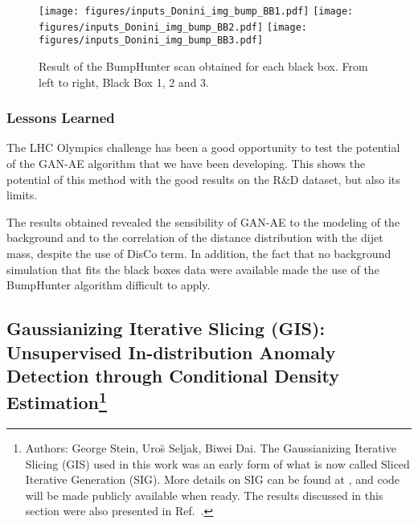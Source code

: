 \documentclass[a4paper,11pt]{article}
\begin{document}
\begin{figure}[h!]
\centering
\texttt{[image: figures/inputs\_Donini\_img\_bump\_BB1.pdf]}
\texttt{[image: figures/inputs\_Donini\_img\_bump\_BB2.pdf]}
\texttt{[image: figures/inputs\_Donini\_img\_bump\_BB3.pdf]}
\caption{Result of the BumpHunter scan obtained for each black box.  From left to right, Black Box 1, 2 and 3.}
\label{fig:GAE_BB_BH}
\end{figure}

\subsubsection{Lessons Learned}
\label{sec:lessons}

The LHC Olympics challenge has been a good opportunity to test the potential of the GAN-AE algorithm that we have been developing.
This shows the potential of this method with the good results on the R\&D dataset, but also its limits.  

The results obtained revealed the sensibility of GAN-AE to the modeling of the background and to the correlation of the distance distribution with the dijet mass, despite the use of DisCo term. In addition, the fact that no background simulation that fits the black boxes data were available made the use of the BumpHunter algorithm difficult to apply.  
 \FloatBarrier
\subsection[Gaussianizing Iterative Slicing (GIS): Unsupervised In-distribution Anomaly Detection through Conditional Density Estimation]{Gaussianizing Iterative Slicing (GIS): Unsupervised In-distribution Anomaly Detection through Conditional Density Estimation\footnote{Authors: George Stein, Uro\u{s} Seljak, Biwei Dai.  The Gaussianizing Iterative Slicing (GIS) used in this work was an early form of what is now called Sliced Iterative Generation (SIG). More details on SIG can be found at \cite{sig}, and code will be made publicly available when ready. The results discussed in this section were also presented in Ref.~\cite{stein2020unsupervised}.}}

\label{sec:gis}
\end{document}

